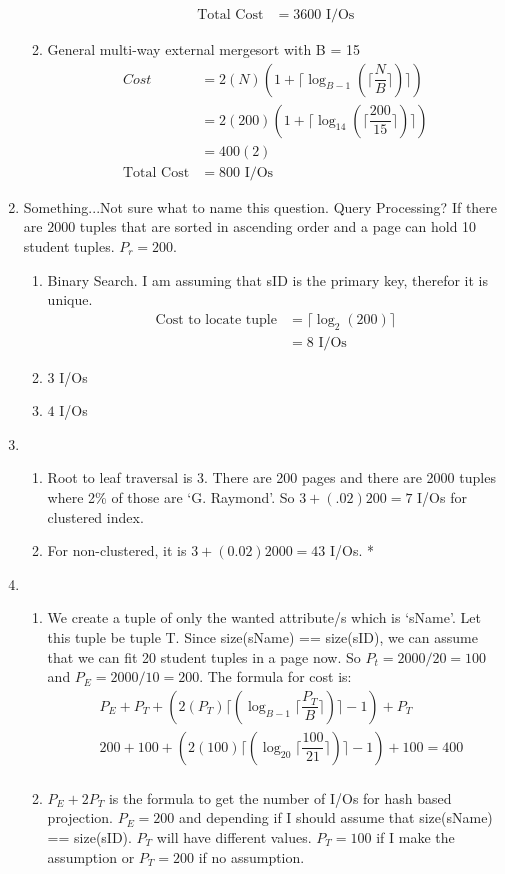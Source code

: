 \documentclass{report}
\begin{document}
\begin{enumerate}
\begin{enumerate}
\begin{align*}
				\text{Total Cost} &= 3600 \text{ I/Os}
			\end{align*}
			\item General multi-way external mergesort with B = 15
			\begin{align*}
				Cost &= 2(N)(1 + \lceil\log_{B-1}(\lceil\dfrac{N}{B}\rceil)\rceil) \\
				&= 2(200)(1 + \lceil\log_{14}(\lceil\dfrac{200}{15}\rceil)\rceil) \\
				&= 400(2) \\
				\text{Total Cost} &= 800 \text{ I/Os}
			\end{align*}
		\end{enumerate}
		\item Something...Not sure what to name this question. Query Processing?
		If there are $2000$ tuples that are sorted in ascending order and a page can hold 10 student tuples. $P_r = 200$.
		\begin{enumerate}
			\item Binary Search. I am assuming that sID is the primary key, therefor it is unique.
			\begin{align*}
				\text{Cost to locate tuple} &= \lceil \log_2(200) \rceil \\
				&= 8 \text{ I/Os}
			\end{align*}

			\item $3$ I/Os
			\item $4$ I/Os
		\end{enumerate}
		\item 
		\begin{enumerate}
			\item Root to leaf traversal is $3$. There are 200 pages and there are 2000 tuples where 2\% of those are `G. Raymond'. So $3 + (.02)200 = 7$ I/Os for clustered index.
			\item For non-clustered, it is $3 + (0.02)2000 = 43$ I/Os. *
		\end{enumerate}
		\item 
		\begin{enumerate}
			\item We create a tuple of only the wanted attribute/s which is `sName'. Let this tuple be tuple T. Since size(sName) == size(sID), we can assume that we can fit 20 student tuples in a page now. So $P_t = 2000/20 = 100$ and $P_E = 2000/10 = 200$. The formula for cost is:
			\begin{align*}
				&P_E + P_T + ( 2(P_T) \lceil(\log_{B-1} \lceil\dfrac{P_T}{B}\rceil)\rceil - 1) + P_T \\
				&200 + 100 + ( 2(100) \lceil(\log_{20} \lceil\dfrac{100}{21}\rceil)\rceil -1 ) + 100 = 400 \\
			\end{align*}
			\item $P_E + 2 P_T$ is the formula to get the number of I/Os for hash based projection. $P_E = 200$ and depending if I should assume that size(sName) == size(sID). $P_T$ will have different values. $P_T = 100$ if I make the assumption or $P_T = 200$ if no assumption. \\


\end{enumerate}
\end{enumerate}
\end{document}
